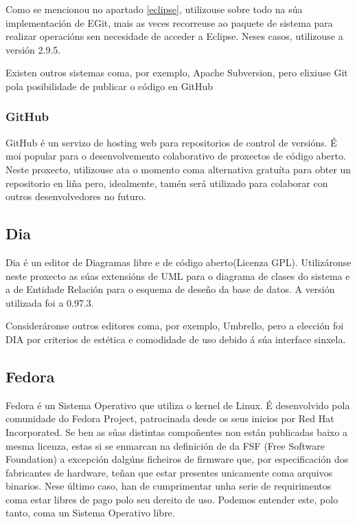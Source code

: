 Como se mencionou no apartado \ref{eclipse}, utilizouse sobre todo na súa implementación de EGit, mais as veces recorreuse ao paquete de sistema para realizar operacións sen necesidade de acceder a Eclipse. Neses casos, utilizouse a versión 2.9.5.

Existen outros sistemas coma, por exemplo, Apache Subversion, pero elixiuse Git pola posibilidade de publicar o código en GitHub

\subsubsection{GitHub}  

GitHub é un servizo de hosting web para repositorios de control de versións. É moi popular para o desenvolvemento colaborativo de proxectos de código aberto. Neste proxecto, utilizouse ata o momento coma alternativa gratuíta para obter un repositorio en liña pero, idealmente, tamén será utilizado para colaborar con outros desenvolvedores no futuro. 


\subsection{Dia}

Dia é un editor de Diagramas libre e de código aberto(Licenza GPL). Utilizáronse neste proxecto as súas extensións de UML para o diagrama de clases do sistema e a de Entidade Relación para o esquema de deseño da base de datos. A versión utilizada foi a 0.97.3.

Consideráronse outros editores coma, por exemplo, Umbrello, pero a elección foi DIA por criterios de estética e comodidade de uso debido á súa interface sinxela.

\subsection{Fedora}

Fedora é un Sistema Operativo que utiliza o kernel de Linux. É desenvolvido pola comunidade do Fedora Project, patrocinada desde os seus inicios por Red Hat Incorporated. Se ben as súas distintas compoñentes non están publicadas baixo a mesma licenza, estas si se enmarcan na definición de  da FSF (Free Software Foundation) a excepción dalgúns ficheiros de firmware que, por especificación dos fabricantes de hardware, teñan que estar presentes unicamente coma arquivos binarios. Nese último caso, han de cumprimentar unha serie de requirimentos coma estar libres de pago polo seu dereito de uso\cite{fedora}. Podemos entender este, polo tanto, coma un Sistema Operativo libre.

